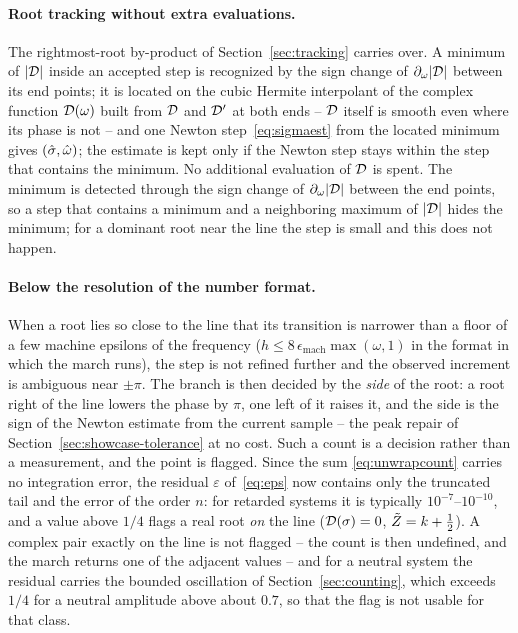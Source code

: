 \paragraph{Root tracking without extra evaluations.} The rightmost-root
by-product of Section~\ref{sec:tracking} carries over. A minimum of $|\mathcal{D}|$
inside an accepted step is recognized by the sign change of
$\partial_\omega|\mathcal{D}|$ between its end points; it is located on the cubic
Hermite interpolant of the complex function $\mathcal{D}(\omega)$ built from $\mathcal{D}$
and $\mathcal{D}'$ at both ends -- $\mathcal{D}$ itself is smooth even where its phase is
not -- and one Newton step~\eqref{eq:sigmaest} from the located minimum gives
$(\hat{\sigma},\hat{\omega})$; the estimate is kept only if the Newton step stays within
the step that contains the minimum. No additional evaluation of $\mathcal{D}$ is
spent. The minimum is detected through the sign change of
$\partial_\omega|\mathcal{D}|$ between the end points, so a step that contains a
minimum and a neighboring maximum of $|\mathcal{D}|$ hides the minimum; for a
dominant root near the line the step is small and this does not happen.

\paragraph{Below the resolution of the number format.} When a root lies so
close to the line that its transition is narrower than a floor of a few
machine epsilons of the frequency ($h\le8\,\epsilon_{\mathrm{mach}}\max(\omega,1)$
in the format in which the march runs), the step is not refined further and
the observed increment is ambiguous near $\pm\pi$.
The branch is then decided by the \emph{side} of the root: a root right of the
line lowers the phase by $\pi$, one left of it raises it, and the side is the
sign of the Newton estimate from the current sample -- the peak repair of
Section~\ref{sec:showcase-tolerance} at no cost. Such a count is a decision
rather than a measurement, and the point is flagged. Since the sum
\eqref{eq:unwrapcount} carries no integration error, the residual
$\varepsilon$ of~\eqref{eq:eps} now contains only the truncated tail and the
error of the order $n$: for retarded systems it is typically
$10^{-7}$--$10^{-10}$, and a value above $1/4$ flags a real root \emph{on}
the line ($\mathcal{D}(\sigma)=0$, $\tilde{Z}=k+\tfrac12$). A complex pair exactly on
the line is not flagged -- the count is then undefined, and the march returns
one of the adjacent values -- and for a neutral system the residual carries
the bounded oscillation of Section~\ref{sec:counting}, which exceeds $1/4$
for a neutral amplitude above about $0.7$, so that the flag is not usable for
that class.

